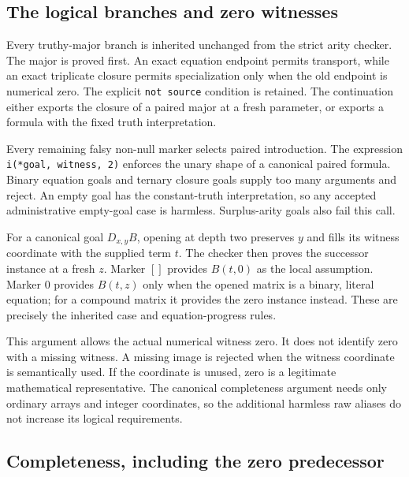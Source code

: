 \documentclass[11pt,letterpaper]{article}
\theoremstyle{definition}\newtheorem{definition}[theorem]{Definition}
\theoremstyle{remark}\newtheorem{remark}[theorem]{Remark}
\begin{document}
\subsection{The logical branches and zero witnesses}

Every truthy-major branch is inherited unchanged from the strict arity
checker.  The major is proved first.  An exact equation endpoint permits
transport, while an exact triplicate closure permits specialization
only when the old endpoint is numerical zero.  The explicit
\texttt{not source} condition is retained.  The continuation either
exports the closure of a paired major at a fresh parameter, or exports
a formula with the fixed truth interpretation.

Every remaining falsy non-null marker selects paired introduction.
The expression \texttt{i(*goal, witness, 2)} enforces the unary shape of
a canonical paired formula.  Binary equation goals and ternary closure
goals supply too many arguments and reject.  An empty goal has the
constant-truth interpretation, so any accepted administrative empty-goal
case is harmless.  Surplus-arity goals also fail this call.

For a canonical goal $D_{x,y}B$, opening at depth two preserves $y$ and
fills its witness coordinate with the supplied term $t$.  The checker
then proves the successor instance at a fresh $z$.  Marker $[]$
provides $B(t,0)$ as the local assumption.  Marker $0$ provides
$B(t,z)$ only when the opened matrix is a binary, literal equation;
for a compound matrix it provides the zero instance instead.  These
are precisely the inherited case and equation-progress rules.

This argument allows the actual numerical witness zero.  It does not
identify zero with a missing witness.  A missing image is rejected when
the witness coordinate is semantically used.  If the coordinate is
unused, zero is a legitimate mathematical representative.  The
canonical completeness argument needs only ordinary arrays and integer
coordinates, so the additional harmless raw aliases do not increase
its logical requirements.

\subsection{Completeness, including the zero predecessor}
\end{document}
